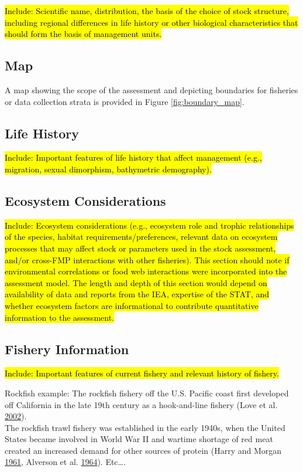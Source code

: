 \documentclass[12pt,]{article}
\begin{document}
\hl{Include: Scientific name, distribution, the basis of the choice of stock structure, 
including regional differences in life history or other biological characteristics 
that should form the basis of management units.}

\subsection{Map}\label{map}

A map showing the scope of the assessment and depicting boundaries for
fisheries or data collection strata is provided in Figure
\ref{fig:boundary_map}.

\subsection{Life History}\label{life-history}

\hl{Include: Important features of life history that affect management (e.g., migration, 
sexual dimorphism, bathymetric demography).}

\subsection{Ecosystem Considerations}\label{ecosystem-considerations-1}

\hl{Include: Ecosystem considerations (e.g., ecosystem role and trophic relationships of 
the species, habitat requirements/preferences, relevant data on ecosystem processes 
that may affect stock or parameters used in the stock assessment, and/or cross-FMP 
interactions with other fisheries). This section should note if environmental 
correlations or food web interactions were incorporated into the assessment model. 
The length and depth of this section would depend on availability of data and reports 
from the IEA, expertise of the STAT, and whether ecosystem factors are informational 
to contribute quantitative information to the assessment.}

\subsection{Fishery Information}\label{fishery-information}

\hl{Include: Important features of current fishery and relevant history of fishery.}

Rockfish example: The rockfish fishery off the U.S. Pacific coast first
developed off California in the late 19th century as a hook-and-line
fishery (Love et al. \protect\hyperlink{ref-Love2002}{2002}).\\
The rockfish trawl fishery was established in the early 1940s, when the
United States became involved in World War II and wartime shortage of
red meat created an increased demand for other sources of protein (Harry
and Morgan \protect\hyperlink{ref-Harry1961}{1961}, Alverson et al.
\protect\hyperlink{ref-Alverson1964}{1964}). Etc\ldots{}.
\end{document}

